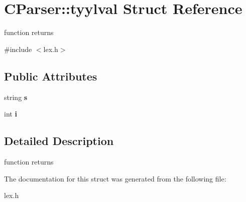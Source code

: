 \hypertarget{struct_c_parser_1_1tyylval}{}\section{C\+Parser\+:\+:tyylval Struct Reference}
\label{struct_c_parser_1_1tyylval}


function returns  




{\ttfamily \#include $<$lex.\+h$>$}

\subsection*{Public Attributes}
\begin{DoxyCompactItemize}
\item 
\mbox{\label{struct_c_parser_1_1tyylval_a52b131df1ea6f074c860b3c1235bb7b1}} 
string {\bfseries s}
\item 
\mbox{\label{struct_c_parser_1_1tyylval_a672dfa344658441aa4eb37eb078b7a6a}} 
int {\bfseries i}
\end{DoxyCompactItemize}


\subsection{Detailed Description}
function returns 



The documentation for this struct was generated from the following file\+:\begin{DoxyCompactItemize}
\item 
lex.\+h\end{DoxyCompactItemize}
